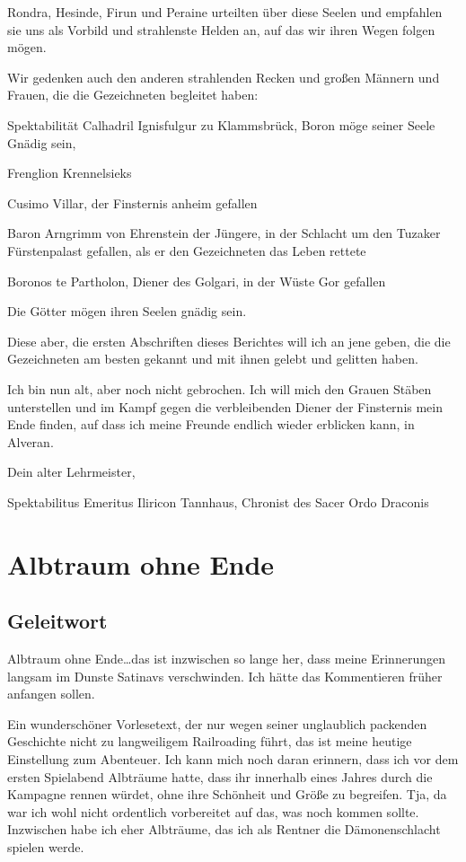 Rondra, Hesinde, Firun und Peraine urteilten über diese Seelen und empfahlen sie uns als Vorbild und strahlenste Helden an, auf das wir ihren Wegen folgen mögen.

Wir gedenken auch den anderen strahlenden Recken und großen Männern und Frauen, die die Gezeichneten begleitet haben:

Spektabilität Calhadril Ignisfulgur zu Klammsbrück, Boron möge seiner Seele Gnädig sein,\par\smallskip
Frenglion Krennelsieks\par\smallskip
Cusimo Villar, der Finsternis anheim gefallen\par\smallskip
Baron Arngrimm von Ehrenstein der Jüngere, in der Schlacht um den Tuzaker Fürstenpalast gefallen, als er den Gezeichneten das Leben rettete\par\smallskip
Boronos te Partholon, Diener des Golgari, in der Wüste Gor gefallen

Die Götter mögen ihren Seelen gnädig sein.

Diese aber, die ersten Abschriften dieses Berichtes will ich an jene geben, die die Gezeichneten am besten gekannt und mit ihnen gelebt und gelitten haben.

Ich bin nun alt, aber noch nicht gebrochen. Ich will mich den Grauen Stäben unterstellen und im Kampf gegen die verbleibenden Diener der Finsternis mein Ende finden, auf dass ich meine Freunde endlich wieder erblicken kann, in Alveran.

Dein alter Lehrmeister,

Spektabilitus Emeritus Iliricon Tannhaus, Chronist des Sacer Ordo Draconis



\chapter{Albtraum ohne Ende}

\section{Geleitwort}

Albtraum ohne Ende\dots das ist inzwischen so lange her, dass meine Erinnerungen langsam im Dunste Satinavs verschwinden. Ich hätte das Kommentieren früher anfangen sollen.

Ein wunderschöner Vorlesetext, der nur wegen seiner unglaublich packenden Geschichte nicht zu langweiligem Railroading führt, das ist meine heutige Einstellung zum Abenteuer. Ich kann mich noch daran erinnern, dass ich vor dem ersten Spielabend Albträume hatte, dass ihr innerhalb eines Jahres durch die Kampagne rennen würdet, ohne ihre Schönheit und Größe zu begreifen. Tja, da war ich wohl nicht ordentlich vorbereitet auf das, was noch kommen sollte. Inzwischen habe ich eher Albträume, das ich als Rentner die Dämonenschlacht spielen werde.

